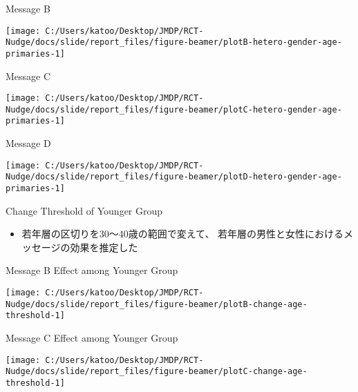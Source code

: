 \documentclass[
      aspectratio=169,
        12pt,
    ]{beamer}
\providecommand{\tightlist}{%
  \setlength{\itemsep}{0pt}\setlength{\parskip}{0pt}}
\begin{document}
\begin{frame}{Message B}
\protect\hypertarget{message-b}{}
\begin{center}\texttt{[image: C:/Users/katoo/Desktop/JMDP/RCT-Nudge/docs/slide/report\_files/figure-beamer/plotB-hetero-gender-age-primaries-1]} \end{center}
\end{frame}

\begin{frame}{Message C}
\protect\hypertarget{message-c}{}
\begin{center}\texttt{[image: C:/Users/katoo/Desktop/JMDP/RCT-Nudge/docs/slide/report\_files/figure-beamer/plotC-hetero-gender-age-primaries-1]} \end{center}
\end{frame}

\begin{frame}{Message D}
\protect\hypertarget{message-d}{}
\begin{center}\texttt{[image: C:/Users/katoo/Desktop/JMDP/RCT-Nudge/docs/slide/report\_files/figure-beamer/plotD-hetero-gender-age-primaries-1]} \end{center}
\end{frame}

\begin{frame}{Change Threshold of Younger Group}
\protect\hypertarget{change-threshold-of-younger-group}{}
\begin{itemize}
\tightlist
\item
  若年層の区切りを30～40歳の範囲で変えて、
  若年層の男性と女性におけるメッセージの効果を推定した
\end{itemize}
\end{frame}

\begin{frame}{Message B Effect among Younger Group}
\protect\hypertarget{message-b-effect-among-younger-group}{}
\begin{center}\texttt{[image: C:/Users/katoo/Desktop/JMDP/RCT-Nudge/docs/slide/report\_files/figure-beamer/plotB-change-age-threshold-1]} \end{center}
\end{frame}

\begin{frame}{Message C Effect among Younger Group}
\protect\hypertarget{message-c-effect-among-younger-group}{}
\begin{center}\texttt{[image: C:/Users/katoo/Desktop/JMDP/RCT-Nudge/docs/slide/report\_files/figure-beamer/plotC-change-age-threshold-1]} \end{center}
\end{frame}
\end{document}
